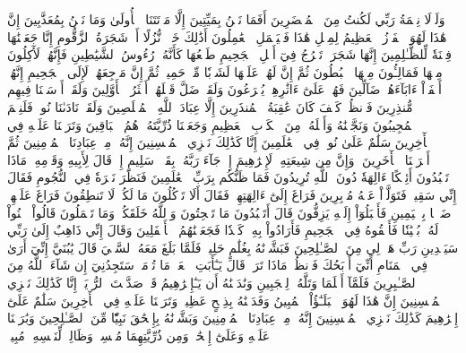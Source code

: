 وَلَوۡلَا نِعۡمَةُ رَبِّي لَكُنتُ مِنَ ٱلۡمُحۡضَرِينَ
أَفَمَا نَحۡنُ بِمَيِّتِينَ
إِلَّا مَوۡتَتَنَا ٱلۡأُولَىٰ وَمَا نَحۡنُ بِمُعَذَّبِينَ
إِنَّ هَٰذَا لَهُوَ ٱلۡفَوۡزُ ٱلۡعَظِيمُ
لِمِثۡلِ هَٰذَا فَلۡيَعۡمَلِ ٱلۡعَٰمِلُونَ
أَذَٰلِكَ خَيۡرٞ نُّزُلًا أَمۡ شَجَرَةُ ٱلزَّقُّومِ
إِنَّا جَعَلۡنَٰهَا فِتۡنَةٗ لِّلظَّـٰلِمِينَ
إِنَّهَا شَجَرَةٞ تَخۡرُجُ فِيٓ أَصۡلِ ٱلۡجَحِيمِ
طَلۡعُهَا كَأَنَّهُۥ رُءُوسُ ٱلشَّيَٰطِينِ
فَإِنَّهُمۡ لَأٓكِلُونَ مِنۡهَا فَمَالِـُٔونَ مِنۡهَا ٱلۡبُطُونَ
ثُمَّ إِنَّ لَهُمۡ عَلَيۡهَا لَشَوۡبٗا مِّنۡ حَمِيمٖ
ثُمَّ إِنَّ مَرۡجِعَهُمۡ لَإِلَى ٱلۡجَحِيمِ
إِنَّهُمۡ أَلۡفَوۡاْ ءَابَآءَهُمۡ ضَآلِّينَ
فَهُمۡ عَلَىٰٓ ءَاثَٰرِهِمۡ يُهۡرَعُونَ
وَلَقَدۡ ضَلَّ قَبۡلَهُمۡ أَكۡثَرُ ٱلۡأَوَّلِينَ
وَلَقَدۡ أَرۡسَلۡنَا فِيهِم مُّنذِرِينَ
فَٱنظُرۡ كَيۡفَ كَانَ عَٰقِبَةُ ٱلۡمُنذَرِينَ
إِلَّا عِبَادَ ٱللَّهِ ٱلۡمُخۡلَصِينَ
وَلَقَدۡ نَادَىٰنَا نُوحٞ فَلَنِعۡمَ ٱلۡمُجِيبُونَ
وَنَجَّيۡنَٰهُ وَأَهۡلَهُۥ مِنَ ٱلۡكَرۡبِ ٱلۡعَظِيمِ
وَجَعَلۡنَا ذُرِّيَّتَهُۥ هُمُ ٱلۡبَاقِينَ
وَتَرَكۡنَا عَلَيۡهِ فِي ٱلۡأٓخِرِينَ
سَلَٰمٌ عَلَىٰ نُوحٖ فِي ٱلۡعَٰلَمِينَ
إِنَّا كَذَٰلِكَ نَجۡزِي ٱلۡمُحۡسِنِينَ
إِنَّهُۥ مِنۡ عِبَادِنَا ٱلۡمُؤۡمِنِينَ
ثُمَّ أَغۡرَقۡنَا ٱلۡأٓخَرِينَ
۞وَإِنَّ مِن شِيعَتِهِۦ لَإِبۡرَٰهِيمَ
إِذۡ جَآءَ رَبَّهُۥ بِقَلۡبٖ سَلِيمٍ
إِذۡ قَالَ لِأَبِيهِ وَقَوۡمِهِۦ مَاذَا تَعۡبُدُونَ
أَئِفۡكًا ءَالِهَةٗ دُونَ ٱللَّهِ تُرِيدُونَ
فَمَا ظَنُّكُم بِرَبِّ ٱلۡعَٰلَمِينَ
فَنَظَرَ نَظۡرَةٗ فِي ٱلنُّجُومِ
فَقَالَ إِنِّي سَقِيمٞ
فَتَوَلَّوۡاْ عَنۡهُ مُدۡبِرِينَ
فَرَاغَ إِلَىٰٓ ءَالِهَتِهِمۡ فَقَالَ أَلَا تَأۡكُلُونَ
مَا لَكُمۡ لَا تَنطِقُونَ
فَرَاغَ عَلَيۡهِمۡ ضَرۡبَۢا بِٱلۡيَمِينِ
فَأَقۡبَلُوٓاْ إِلَيۡهِ يَزِفُّونَ
قَالَ أَتَعۡبُدُونَ مَا تَنۡحِتُونَ
وَٱللَّهُ خَلَقَكُمۡ وَمَا تَعۡمَلُونَ
قَالُواْ ٱبۡنُواْ لَهُۥ بُنۡيَٰنٗا فَأَلۡقُوهُ فِي ٱلۡجَحِيمِ
فَأَرَادُواْ بِهِۦ كَيۡدٗا فَجَعَلۡنَٰهُمُ ٱلۡأَسۡفَلِينَ
وَقَالَ إِنِّي ذَاهِبٌ إِلَىٰ رَبِّي سَيَهۡدِينِ
رَبِّ هَبۡ لِي مِنَ ٱلصَّـٰلِحِينَ
فَبَشَّرۡنَٰهُ بِغُلَٰمٍ حَلِيمٖ
فَلَمَّا بَلَغَ مَعَهُ ٱلسَّعۡيَ قَالَ يَٰبُنَيَّ إِنِّيٓ أَرَىٰ فِي ٱلۡمَنَامِ أَنِّيٓ أَذۡبَحُكَ فَٱنظُرۡ مَاذَا تَرَىٰۚ قَالَ يَـٰٓأَبَتِ ٱفۡعَلۡ مَا تُؤۡمَرُۖ سَتَجِدُنِيٓ إِن شَآءَ ٱللَّهُ مِنَ ٱلصَّـٰبِرِينَ
فَلَمَّآ أَسۡلَمَا وَتَلَّهُۥ لِلۡجَبِينِ
وَنَٰدَيۡنَٰهُ أَن يَـٰٓإِبۡرَٰهِيمُ
قَدۡ صَدَّقۡتَ ٱلرُّءۡيَآۚ إِنَّا كَذَٰلِكَ نَجۡزِي ٱلۡمُحۡسِنِينَ
إِنَّ هَٰذَا لَهُوَ ٱلۡبَلَـٰٓؤُاْ ٱلۡمُبِينُ
وَفَدَيۡنَٰهُ بِذِبۡحٍ عَظِيمٖ
وَتَرَكۡنَا عَلَيۡهِ فِي ٱلۡأٓخِرِينَ
سَلَٰمٌ عَلَىٰٓ إِبۡرَٰهِيمَ
كَذَٰلِكَ نَجۡزِي ٱلۡمُحۡسِنِينَ
إِنَّهُۥ مِنۡ عِبَادِنَا ٱلۡمُؤۡمِنِينَ
وَبَشَّرۡنَٰهُ بِإِسۡحَٰقَ نَبِيّٗا مِّنَ ٱلصَّـٰلِحِينَ
وَبَٰرَكۡنَا عَلَيۡهِ وَعَلَىٰٓ إِسۡحَٰقَۚ وَمِن ذُرِّيَّتِهِمَا مُحۡسِنٞ وَظَالِمٞ لِّنَفۡسِهِۦ مُبِينٞ
